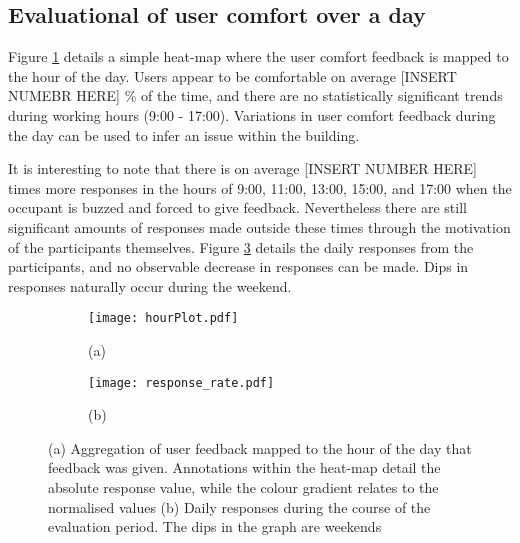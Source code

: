 

\subsection{Evaluational of user comfort over a day}

Figure \ref{fig:hourPlot} details a simple heat-map where the user comfort feedback is mapped to the hour of the day. Users appear to be comfortable on average [INSERT NUMEBR HERE] \% of the time, and there are no statistically significant trends during working hours (9:00 - 17:00). Variations in user comfort feedback during the day can be used to infer an issue within the building.

It is interesting to note that there is on average [INSERT NUMBER HERE] times more responses in the hours of 9:00, 11:00, 13:00, 15:00, and 17:00 when the occupant is buzzed and forced to give feedback. Nevertheless there are still significant amounts of responses made outside these times through the motivation of the participants themselves. Figure \ref{fig:responseRate} details the daily responses from the participants, and no observable decrease in responses can be made. Dips in responses naturally occur during the weekend. 


\begin{figure}
\centering
	\begin{subfigure}[t]{0.5\textwidth}
	\texttt{[image: hourPlot.pdf]}
	\caption{(a)}
	\label{fig:hourPlot}
	\end{subfigure}
	\begin{subfigure}[t]{0.49\textwidth}
	\texttt{[image: response\_rate.pdf]}
	\caption{(b)}
	\label{fig:responseRate}
	\end{subfigure}
	\caption{(a) Aggregation of user feedback mapped to the hour of the day that feedback was given. Annotations within the heat-map detail the absolute response value, while the colour gradient relates to the normalised values (b) Daily responses during the course of the evaluation period. The dips in the graph are weekends}
\end{figure}


